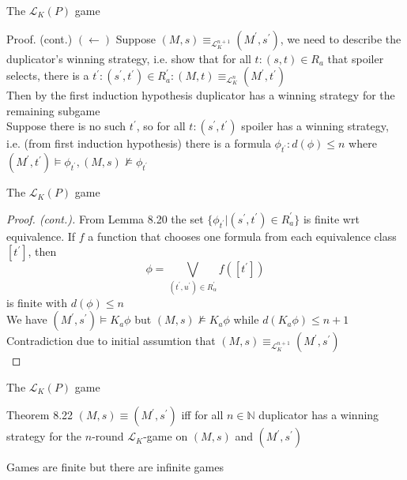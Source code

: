 \documentclass{beamer}
\newcommand{\lang}{\mathcal{L}}
\begin{document}
\begin{frame}{The $\lang_K(P)$ game}
	\begin{block}{Proof. (cont.)}
		$(\leftarrow)$ Suppose $(M,s) \equiv_{\lang_K^{n+1}} (M^\prime,s^\prime)$, we need to describe the duplicator's winning strategy, i.e. show that for all $t: (s,t) \in R_a$ that spoiler selects, there is a $t^\prime: (s^\prime,t^\prime) \in R_a^\prime: (M,t) \equiv_{\lang_K^n} (M^\prime,t^\prime)$\\
		Then by the first induction hypothesis duplicator has a winning strategy for the remaining subgame \pause
		\\[8pt]
		Suppose there is no such $t^\prime$, so for all $t: (s^\prime,t^\prime)$ spoiler has a winning strategy, i.e. (from first induction hypothesis) there is a formula $\phi_{t^\prime}: d(\phi) \leq n$ where $(M^\prime,t^\prime) \models \phi_{t^\prime}, (M,s) \not\models \phi_{t^\prime}$
	\end{block}
\end{frame}

\begin{frame}{The $\lang_K(P)$ game}
	\begin{proof}[Proof. (cont.)]
		From Lemma 8.20 the set $\{\phi_{t^\prime} | (s^\prime,t^\prime) \in R_a^\prime\}$ is finite wrt equivalence.
		If $f$ a function that chooses one formula from each equivalence class $[t^\prime]$, then
		\[ \phi = \bigvee_{(t^\prime,u^\prime)\in R_{\alpha}^\prime} f([t^\prime]) \]
		is finite with $d(\phi) \leq n$ \pause
		\\[4pt]
		We have $(M^\prime,s^\prime) \models K_a \phi$ but $(M,s) \not\models K_a \phi$ while $d(K_a \phi) \leq n+1$\\
		Contradiction due to initial assumtion that $(M,s) \equiv_{\lang_K^{n+1}} (M^\prime,s^\prime)$\\
	\end{proof}
\end{frame}

\begin{frame}{The $\lang_K(P)$ game}
	\begin{block}{Theorem 8.22}
		$(M,s) \equiv (M^\prime,s^\prime)$ iff for all $n \in \mathbb{N}$ duplicator has a winning strategy for the $n$-round $\lang_K$-game on $(M,s)$ and $(M^\prime,s^\prime)$
	\end{block} \pause
	Games are finite but there are infinite games
\end{frame}
\end{document}
